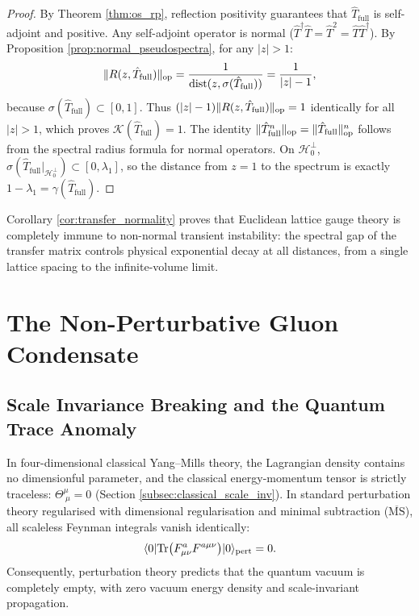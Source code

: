 \begin{proof}
By Theorem \ref{thm:os_rp}, reflection positivity guarantees that $\hat{T}_{\mathrm{full}}$ is self-adjoint and positive. Any self-adjoint operator is normal ($\hat{T}^\dagger \hat{T} = \hat{T}^2 = \hat{T} \hat{T}^\dagger$). By Proposition \ref{prop:normal_pseudospectra}, for any $|z| > 1$:
\begin{equation}
\|R(z, \hat{T}_{\mathrm{full}})\|_{\mathrm{op}} = \frac{1}{\mathrm{dist}(z, \sigma(\hat{T}_{\mathrm{full}}))} = \frac{1}{|z| - 1},
\end{equation}
because $\sigma(\hat{T}_{\mathrm{full}}) \subset [0, 1]$. Thus $(|z| - 1) \|R(z, \hat{T}_{\mathrm{full}})\|_{\mathrm{op}} = 1$ identically for all $|z| > 1$, which proves $\mathcal{K}(\hat{T}_{\mathrm{full}}) = 1$. The identity $\|\hat{T}_{\mathrm{full}}^n\|_{\mathrm{op}} = \|\hat{T}_{\mathrm{full}}\|_{\mathrm{op}}^n$ follows from the spectral radius formula for normal operators. On $\mathcal{H}_0^\perp$, $\sigma(\hat{T}_{\mathrm{full}}|_{\mathcal{H}_0^\perp}) \subset [0, \lambda_1]$, so the distance from $z = 1$ to the spectrum is exactly $1 - \lambda_1 = \gamma(\hat{T}_{\mathrm{full}})$.
\end{proof}

Corollary \ref{cor:transfer_normality} proves that Euclidean lattice gauge theory is completely immune to non-normal transient instability: the spectral gap of the transfer matrix controls physical exponential decay at all distances, from a single lattice spacing to the infinite-volume limit.

\section{The Non-Perturbative Gluon Condensate}
\label{sec:gluon_condensate}

\subsection{Scale Invariance Breaking and the Quantum Trace Anomaly}
\label{subsec:trace_anomaly_gluon}

In four-dimensional classical Yang--Mills theory, the Lagrangian density contains no dimensionful parameter, and the classical energy-momentum tensor is strictly traceless: $\Theta^\mu_{\ \mu} = 0$ (Section \ref{subsec:classical_scale_inv}). In standard perturbation theory regularised with dimensional regularisation and minimal subtraction ($\overline{\mathrm{MS}}$), all scaleless Feynman integrals vanish identically:
\begin{equation}
\label{eq:perturbative_condensate_zero}
\langle 0 | \mathrm{Tr}\bigl( F_{\mu\nu}^a F^{a\mu\nu} \bigr) | 0 \rangle_{\mathrm{pert}} = 0.
\end{equation}
Consequently, perturbation theory predicts that the quantum vacuum is completely empty, with zero vacuum energy density and scale-invariant propagation.

